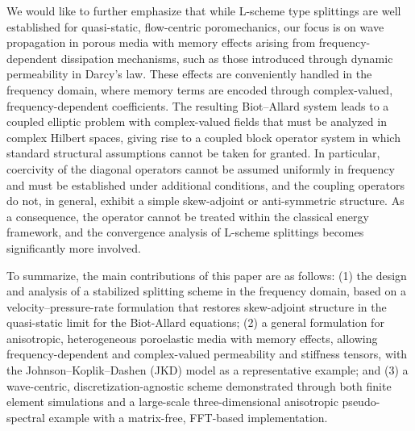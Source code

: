 \documentclass[pdflatex,sn-mathphys-num]{sn-jnl}
\theoremstyle{thmstyleone}%
\theoremstyle{thmstyletwo}%
\theoremstyle{thmstylethree}%
\theoremstyle{definition}
\begin{document}
	We would like to further emphasize that while L-scheme type splittings are well established for quasi-static, flow-centric poromechanics, our focus is on wave propagation in porous media with memory effects arising from frequency-dependent dissipation mechanisms, such as those introduced through dynamic permeability in Darcy's law. These effects are conveniently handled in the frequency domain, where memory terms are encoded through complex-valued, frequency-dependent coefficients. The resulting Biot--Allard system leads to a coupled elliptic problem with complex-valued fields that must be analyzed in complex Hilbert spaces, giving rise to a coupled block operator system in which standard structural assumptions cannot be taken for granted. In particular, coercivity of the diagonal operators cannot be assumed uniformly in frequency and must be established under additional conditions, and the coupling operators do not, in general, exhibit a simple skew-adjoint or anti-symmetric structure. As a consequence, the operator cannot be treated within the classical energy framework, and the convergence analysis of L-scheme splittings becomes significantly more involved.
	
	To summarize, the main contributions of this paper are as follows: (1) the design and analysis  of a stabilized splitting scheme in the frequency domain, based on a velocity--pressure-rate formulation that restores skew-adjoint structure in the quasi-static limit for the Biot-Allard equations; (2) a general formulation for anisotropic, heterogeneous poroelastic media with memory effects, allowing frequency-dependent and complex-valued permeability and stiffness tensors, with the Johnson--Koplik--Dashen (JKD) model as a representative example; and (3) a wave-centric, discretization-agnostic scheme demonstrated through both finite element simulations and a large-scale three-dimensional anisotropic pseudo-spectral example with a matrix-free, FFT-based implementation. 
	
	
	\color{black}
	
\end{document}

